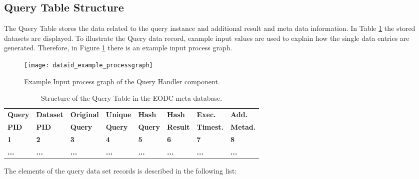 \documentclass[draft,final]{vutinfth} %
\begin{document}
\subsection{Query Table Structure}

The Query Table stores the data related to the query instance and additional result and meta data information. In Table \ref{Tab:querytable} the stored datasets are displayed. To illustrate the Query data record, example input values are used to explain how the single data entries are generated. Therefore, in Figure \ref{fig:processgraph_example} there is an example input process graph.   

\begin{figure}[h]
	\centering
	\texttt{[image: dataid\_example\_processgraph]}
	\caption{Example Input process graph of the Query Handler component.}
	\label{fig:processgraph_example} %
\end{figure}

\begin{table}[]
	\caption{Structure of the Query Table in the EODC meta database.}
	\begin{tabular}{|l|l|l|l|l|l|l|l|}
	\hline	\textbf{Query} & \textbf{Dataset} & \textbf{Original} & \textbf{Unique} & \textbf{Hash} & \textbf{Hash} &
		\textbf{Exec.} & \textbf{Add.}  \\ 
		\textbf{PID} & \textbf{PID} & \textbf{Query} & \textbf{Query} & \textbf{Query} & \textbf{Result} &
		\textbf{Timest.} & \textbf{Metad.}  \\ \hline
		\textbf{1} & \textbf{2} & \textbf{3} & \textbf{4} & \textbf{5} & \textbf{6} &
		\textbf{7} & \textbf{8} \\ \hline
		\textbf{...} & \textbf{...} & \textbf{...} & \textbf{...} & \textbf{...} & \textbf{...} & \textbf{...} & \textbf{...} \\ \hline
	\end{tabular}
	\label{Tab:querytable}
\end{table}

The elements of the query data set records is described in the following list:
\end{document}
